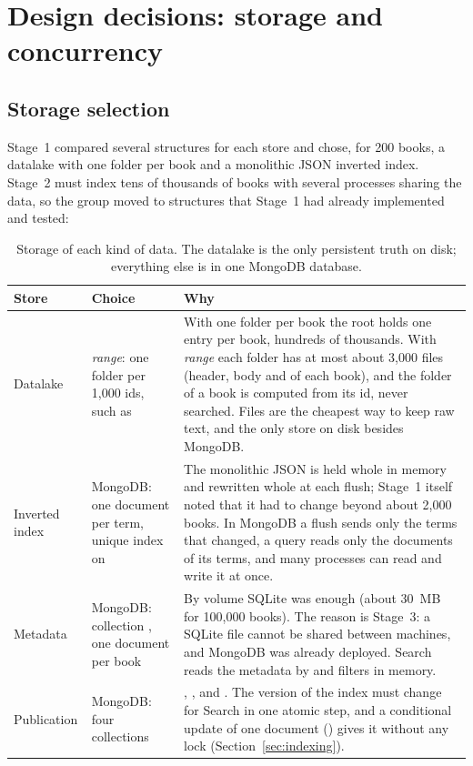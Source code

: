 \section{Design decisions: storage and concurrency}
\label{sec:decisions-storage}

\subsection{Storage selection}

Stage~1 compared several structures for each store and chose, for 200 books, a datalake with one folder per book and a
monolithic JSON inverted index. Stage~2 must index tens of thousands of books with several processes sharing the data,
so the group moved to structures that Stage~1 had already implemented and tested:

\begin{table}[H]
\centering\small
\begin{tabularx}{\linewidth}{@{}L{2.2cm}L{3.3cm}X@{}}
\toprule
\textbf{Store} & \textbf{Choice} & \textbf{Why} \\
\midrule
Datalake & \emph{range}: one folder per 1,000 ids, such as  &
  With one folder per book the root holds one entry per book, hundreds of thousands. With \emph{range} each folder has
  at most about 3,000 files (header, body and  of each book), and the folder of a book is computed from
  its id, never searched. Files are the cheapest way to keep raw text, and the only store on disk besides MongoDB. \\
Inverted index & MongoDB: one document  per term, unique index on  &
  The monolithic JSON is held whole in memory and rewritten whole at each flush; Stage~1 itself noted that it had to
  change beyond about 2,000 books. In MongoDB a flush sends only the terms that changed, a query reads only the
  documents of its terms, and many processes can read and write it at once. \\
Metadata & MongoDB: collection , one document per book &
  By volume SQLite was enough (about 30~MB for 100,000 books). The reason is Stage~3: a SQLite file cannot be shared
  between machines, and MongoDB was already deployed. Search reads the metadata by  and filters in memory. \\
Publication & MongoDB: four collections &
  , ,  and . The version of the index must change for Search in one atomic step, and a conditional update of one document
  () gives it without any lock (Section~\ref{sec:indexing}). \\
\bottomrule
\end{tabularx}
\caption{Storage of each kind of data. The datalake is the only persistent truth on disk; everything else is in one
MongoDB database.}
\label{tab:storage}
\end{table}

